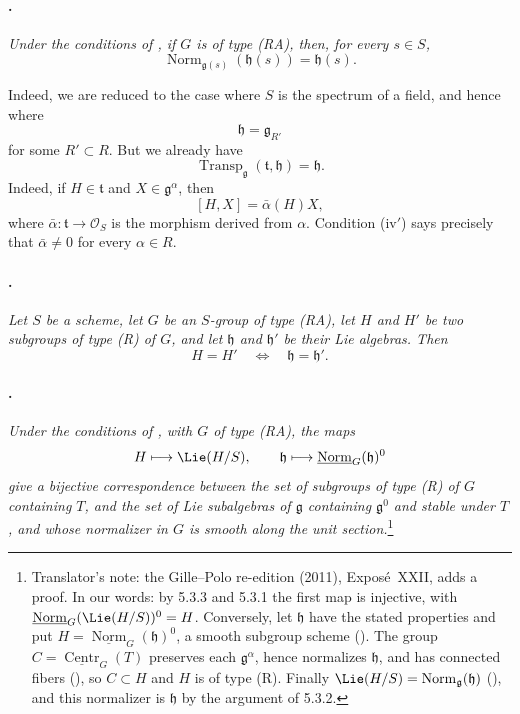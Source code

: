 \paragraph{.}
\textit{Under the conditions of , if \(G\) is of type
\textup{(RA)}, then, for every \(s\in S\),}
\[
  \operatorname{Norm}_{\mathfrak g(s)}(\mathfrak h(s))
  =
  \mathfrak h(s).
\]

Indeed, we are reduced to the case where \(S\) is the spectrum of a
field, and hence where
\[
  \mathfrak h=\mathfrak g_{R'}
\]
for some \(R'\subset R\). But we already have
\[
  \operatorname{Transp}_{\mathfrak g}
    (\mathfrak t,\mathfrak h)
  =
  \mathfrak h.
\]
Indeed, if \(H\in\mathfrak t\) and
\(X\in\mathfrak g^\alpha\), then
\[
  [H,X]=\bar\alpha(H)X,
\]
where \(\bar\alpha:\mathfrak t\to\mathcal O_S\) is the morphism
derived from \(\alpha\). Condition \textup{(iv$'$)} says precisely
that \(\bar\alpha\ne0\) for every \(\alpha\in R\).

\paragraph{.}
\textit{Let \(S\) be a scheme, let \(G\) be an \(S\)-group of type
\textup{(RA)}, let \(H\) and \(H'\) be two subgroups of type
\textup{(R)} of \(G\), and let \(\mathfrak h\) and
\(\mathfrak h'\) be their Lie algebras. Then}
\[
  H=H'
  \quad\Longleftrightarrow\quad
  \mathfrak h=\mathfrak h'.
\]

\paragraph{.}
\textit{Under the conditions of , with \(G\) of type
\textup{(RA)}, the maps}
\[
  H\longmapsto\Lie(H/S),
  \qquad
  \mathfrak h\longmapsto
    \underline{\operatorname{Norm}}_G(\mathfrak h)^0
\]
\textit{give a bijective correspondence between the set of
subgroups of type \textup{(R)} of \(G\) containing \(T\), and the
set of Lie subalgebras of \(\mathfrak g\) containing
\(\mathfrak g^0\) and stable under \(T\), and whose normalizer in
\(G\) is smooth along the unit section.}\footnote{Translator's note: the Gille--Polo re-edition (2011), Exposé~XXII,
adds a proof. In our words: by 5.3.3 and 5.3.1 the first map is injective, with
\(\underline{\operatorname{Norm}}_G(\Lie(H/S))^0=H\). Conversely, let
\(\mathfrak h\) have the stated properties and put
\(H=\underline{\operatorname{Norm}}_G(\mathfrak h)^0\), a smooth subgroup scheme
(). The group
\(C=\underline{\operatorname{Centr}}_G(T)\) preserves each
\(\mathfrak g^\alpha\), hence normalizes \(\mathfrak h\), and has connected
fibers (), so \(C\subset H\) and \(H\) is of type \textup{(R)}.
Finally \(\Lie(H/S)=\operatorname{Norm}_{\mathfrak g}(\mathfrak h)\)
(), and this normalizer is \(\mathfrak h\) by the argument of
5.3.2.}

